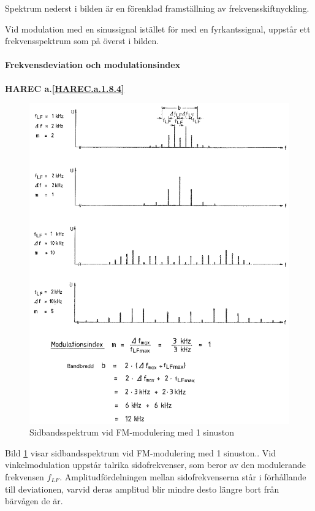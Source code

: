 Spektrum nederst i bilden är en förenklad framställning av
frekvensskiftnyckling.

Vid modulation med en sinussignal istället för med en fyrkantssignal, uppstår
ett frekvensspektrum som på överst i bilden.

\paragraph{Frekvensdeviation och modulationsindex}
\textbf{HAREC a.\ref{HAREC.a.1.8.4}\label{myHAREC.a.1.8.4}}

\begin{figure}
\includegraphics[width=\textwidth]{images/cropped_pdfs/bild_2_1-31.pdf}
\caption{Sidbandsspektrum vid FM-modulering med 1 sinuston}
\label{fig:BildII1-31}
\end{figure}

Bild \ref{fig:BildII1-31} visar sidbandsspektrum vid FM-modulering med 1
sinuston..
Vid vinkelmodulation uppstår talrika sidofrekvenser, som beror av den
modulerande frekvensen \(f_{LF}\).
Amplitudfördelningen mellan sidofrekvenserna står i förhållande till
deviationen, varvid deras amplitud blir mindre desto längre bort från bärvågen
de är.

